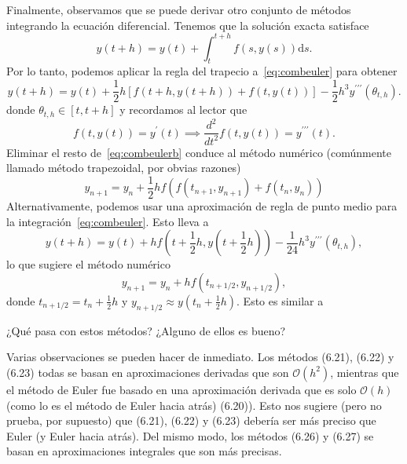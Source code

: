 Finalmente, observamos que se puede derivar otro conjunto de métodos integrando la ecuación diferencial. Tenemos que la solución exacta satisface
\begin{equation}\label{eq:combeuler}
y\left(t+h\right)=y\left(t\right)+\int_{t}^{t+h}f\left(s,y\left(s\right)\right)\mathrm{d}s.
\end{equation}
Por lo tanto, podemos aplicar la regla del trapecio a~\eqref{eq:combeuler} para  obtener
\begin{equation}\label{eq:combeulerb}
y\left(t+h\right)=y\left(t\right)+\frac{1}{2}h\left[f\left(t+h,y\left(t+h\right)\right)+f\left(t,y\left(t\right)\right)\right]-\frac{1}{2}h^{3}y^{\prime\prime\prime}\left(\theta_{t,h}\right).
\end{equation}
donde $\theta_{t,h}\in\left[t,t+h\right]$ y recordamos al lector que
\[ f\left(t,y\left(t\right)\right)=y^{\prime}\left(t\right)\implies\frac{d^{2}}{dt^{2}}f\left(t,y\left(t\right)\right)=y^{\prime\prime\prime}\left(t\right). \]
Eliminar el resto de~\eqref{eq:combeulerb} conduce al método numérico (comúnmente llamado método trapezoidal, por obvias razones)
\begin{equation}
y_{n+1}=y_{n}+\frac{1}{2}hf\left(f\left(t_{n+1},y_{n+1}\right)+f\left(t_{n},y_{n}\right)\right)
\end{equation}
Alternativamente, podemos usar una aproximación de regla de punto medio para la integración~\eqref{eq:combeuler}. Esto lleva a
\[ y\left(t+h\right)=y\left(t\right)+hf\left(t+\frac{1}{2}h,y\left(t+\frac{1}{2}h\right)\right)-\frac{1}{24}h^{3}y^{\prime\prime\prime}\left(\theta_{t,h}\right), \]
lo que sugiere el método numérico
\begin{equation}
y_{n+1}=y_{n}+hf\left(t_{n+1/2},y_{n+1/2}\right),
\end{equation}
donde $t_{n+1/2}=t_{n}+\frac{1}{2}h$ y $y_{n+1/2}\approx y\left(t_{n}+\frac{1}{2}h\right)$. Esto es similar a %

¿Qué pasa con estos métodos? ¿Alguno de ellos es bueno?

Varias observaciones se pueden hacer de inmediato. Los métodos (6.21), (6.22) y (6.23)
todas se basan en aproximaciones derivadas que son $\mathcal{O}\left(h^{2}\right)$, mientras que el método de Euler fue basado en una aproximación derivada que es solo $\mathcal{O}\left(h\right)$ (como lo es el método de Euler hacia atrás) (6.20)). Esto nos sugiere (pero no prueba, por supuesto) que (6.21), (6.22) y (6.23)
debería ser más preciso que Euler (y Euler hacia atrás). Del mismo modo, los métodos (6.26) y (6.27) se basan en aproximaciones integrales que son más precisas.


